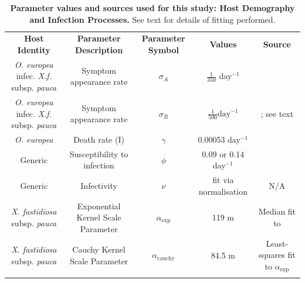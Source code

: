 \documentclass[11pt,letterpaper]{article}
\newlength\savedwidth
\newcommand\thickhline{\noalign{\global\savedwidth\arrayrulewidth\global\arrayrulewidth 2pt}%
\hline
\noalign{\global\arrayrulewidth\savedwidth}}
\begin{document}
\begin{table}
\centering
\begin{adjustbox}{width=\textwidth}
\small
    \begin{tabular}{|c|c|c|c|c|}
    \thickhline
         \textbf{Host Identity }  & \textbf{Parameter Description} & \textbf{Parameter Symbol} & \textbf{Values} & \textbf{Source}\\
         \thickhline
        \thickhline
         \emph{O. europea} infec. \emph{X.f.} subsp. \emph{pauca} & Symptom appearance rate & $\sigma_{A}$& $\frac{1}{350}$ day$^{-1}$ &  \cite{Bragard2019}\\
         \thickhline
                  \emph{O. europea} infec. \emph{X.f.} subsp. \emph{pauca} & Symptom appearance rate & $\sigma_{B}$& $\frac{1}{500} \mathrm{day}^{-1}$ &  \cite{Bragard2019}; see text\\
        \thickhline
         \emph{O. europea} & Death rate (I) & $\gamma$  & 0.00053 day$^{-1}$&  \cite{Bragard2019} \\
        \thickhline
        Generic & Susceptibility to infection& $\phi$& 0.09 or 0.14 day$^{-{1}}$& \cite{HyattTwynam2017}\\
        \thickhline
        Generic & Infectivity & $\nu$ & fit via normalisation & N/A \\
        \thickhline
        \emph{X. fastidiosa} subsp. \emph{pauca}& Exponential Kernel Scale Parameter & $\alpha_{\mathrm{exp}}$ & 119 m & Median fit to \cite{Bodino2021}\\
        \thickhline
        \emph{X. fastidiosa} subsp. \emph{pauca}& Cauchy Kernel Scale Parameter & $\alpha_{\mathrm{cauchy}}$ & 84.5 m & Least-squares fit to $\alpha_{\mathrm{exp}}$ \\
        \thickhline
    \end{tabular}
    \end{adjustbox}
    \caption{ \textbf{Parameter values and sources used for this study: Host Demography and Infection Processes.} See text for details of fitting performed.}
    \label{demography}
\end{table}
\end{document}
